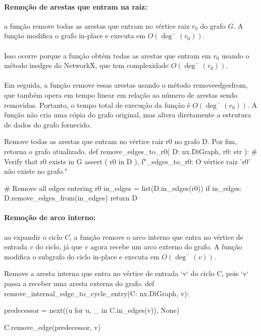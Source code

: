 \documentclass[12pt,a4paper]{article}
\def\texttt#1{#1}%
\def\emph#1{#1}%
\def\_{}%
\begin{document}
\paragraph{Remoção de arestas que entram na raiz:}
a função remove todas as arestas que entram no vértice raiz \(r_0\) do grafo \(G\). A função modifica o grafo \emph{in-place} e executa em \(O(\deg^-(r_0))\).

\paragraph{}
Isso ocorre porque a função obtém todas as arestas que entram em \(r_0\) usando o método \texttt{in\_edges} do NetworkX, que tem complexidade \(O(\deg^-(r_0))\).

\paragraph{}
Em seguida, a função remove essas arestas usando o método \texttt{remove\_edges\_from}, que também opera em tempo linear em relação ao número de arestas sendo removidas. Portanto, o tempo total de execução da função é \(O(\deg^-(r_0))\). A função não cria uma cópia do grafo original, mas altera diretamente a estrutura de dados do grafo fornecido.

\begin{pybox}[title={Remoção de arestas que entram na raiz},colback=blue!5!white,colframe=blue!75!black]{Remove todas as arestas que entram no vértice raiz r0 no grafo D. Por fim, retorna o grafo atualizado.}
def remove_edges_to_r0(
    D: nx.DiGraph, r0: str
):
    # Verify that r0 exists in G
    assert (
            r0 in D
        ), f"\nremove_edges_to_r0: O vértice raiz '{r0}' não existe no grafo."

    # Remove all edges entering r0
    in_edges = list(D.in_edges(r0))
    if in_edges:
        D.remove_edges_from(in_edges)
    return D
\end{pybox}

\paragraph{Remoção de arco interno:}
ao expandir o ciclo \(C\), a função remove o arco interno que entra no vértice de entrada \(v\) do ciclo, já que \(v\) agora recebe um arco externo do grafo. A função modifica o subgrafo do ciclo \emph{in-place} e executa em \(O(\deg^-(v))\).

\begin{pybox}[title={Remover arco interno na reexpansão},colback=blue!5!white,colframe=blue!75!black]{Remove a aresta interna que entra no vértice de entrada `v` do ciclo C, pois `v` passa a receber uma aresta externa do grafo.}
def remove_internal_edge_to_cycle_entry(C: nx.DiGraph, v):

    predecessor = next((u for u, _ in C.in_edges(v)), None)

    C.remove_edge(predecessor, v)
\end{pybox}
\end{document}
